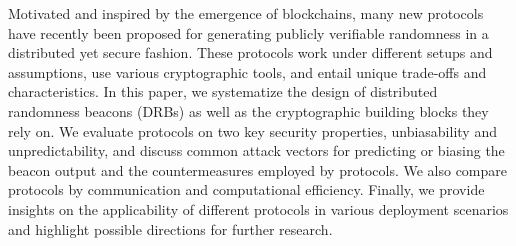 Motivated and inspired by the emergence of blockchains, many new protocols have recently been proposed for generating publicly verifiable randomness in a distributed yet secure fashion. These protocols work under different setups and assumptions, use various cryptographic tools, and entail unique trade-offs and characteristics. In this paper, we systematize the design of distributed randomness beacons (DRBs) as well as the cryptographic building blocks they rely on.
We evaluate protocols on two key security properties, unbiasability and unpredictability, and discuss common attack vectors for predicting or biasing the beacon output and the countermeasures employed by protocols. We also compare protocols by communication and computational efficiency.
Finally, we provide insights on the applicability of different protocols in various deployment scenarios and highlight possible directions for further research.

